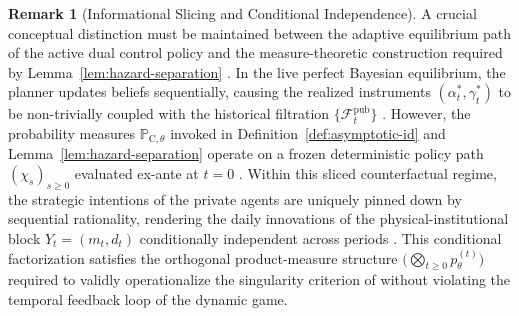 \documentclass[ecta,nameyear,final,supplement]{econsocart}
\numberwithin{equation}{section}
\numberwithin{table}{section}
\theoremstyle{definition}
\newtheorem{remark}[theorem]{Remark}
\newcommand{\ProbC}[1]{\mathbb{P}_{\mathrm{C},#1}}
\begin{document}
\begin{remark}[Informational Slicing and Conditional Independence]\label{rem:info-slicing}
A crucial conceptual distinction must be maintained between the adaptive
equilibrium path of the active dual control policy and the measure-theoretic
construction required by Lemma~\ref{lem:hazard-separation}
\citep{Kakutani1948, BlackwellDubins1962}. In the live perfect Bayesian
equilibrium, the planner updates beliefs sequentially, causing the realized
instruments $(\alpha_t^*, \gamma_t^*)$ to be non-trivially coupled with the
historical filtration $\{\mathcal{F}_t^{\mathrm{pub}}\}$
\citep{AghionBoltonHarrisJullien1991, EasleyKiefer1988}. However, the
probability measures $\ProbC{\theta}$ invoked in
Definition~\ref{def:asymptotic-id} and Lemma~\ref{lem:hazard-separation}
operate on a frozen deterministic policy path $(\chi_s)_{s \ge 0}$ evaluated
ex-ante at $t=0$ \citep{BlackwellDubins1962}. Within this sliced
counterfactual regime, the strategic intentions of the private agents are
uniquely pinned down by sequential rationality, rendering the daily innovations
of the physical-institutional block $Y_t = (m_t, d_t)$ conditionally
independent across periods \citep{Kakutani1948}. This conditional factorization
satisfies the orthogonal product-measure structure
$\bigl(\bigotimes_{t \ge 0} p_{\theta}^{(t)}\bigr)$ required to validly
operationalize the singularity criterion of \citet{Kakutani1948} without
violating the temporal feedback loop of the dynamic game.
\end{remark}
\end{document}
